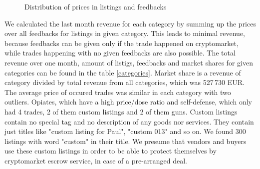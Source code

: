 \documentclass[
  digital, %
  table,   %
  lof,     %
  lot,     %
  oneside
]{fithesis3}
\begin{document}
\begin{figure}[!htb]
    
\caption[justification=centering]{Distribution of prices in listings and feedbacks\newline }
\end{figure}

We calculated the last month revenue for each category
by summing up the prices over all feedbacks for listings in given category.
This leads to minimal revenue, because feedbacks
can be given only if the trade happened on cryptomarket, while 
trades happening with no given feedbacks are also possible.
The total revenue over one month, amount of listigs, feedbacks and market shares for given categories 
can be found in the table \ref{categories}.
Market share is a revenue of category divided by total revenue from all categories, which was 527\,730 EUR.
The average price of occured trades was similar in each category
with two outliers. Opiates, which have a high price/dose ratio and 
self-defense, which only had 4 trades, 2 of them custom listings and 2 of them guns.
Custom listings contain no special tag and no description of any goods nor services.
They contain just titles like "custom listing for Paul", "custom 013" and so on.
We found 300 listings with word "custom" in their title. 
We presume that vendors and buyers use these custom listings in order to be able to protect themselves
by cryptomarket escrow service, in case of a pre-arranged deal.
\end{document}
